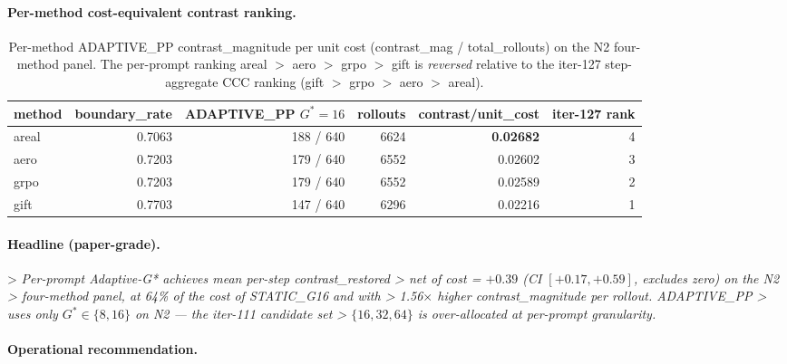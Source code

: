 \paragraph{Per-method cost-equivalent contrast ranking.}

\begin{table}[h]
\centering\small
\caption{Per-method ADAPTIVE\_PP contrast\_magnitude per unit cost
(contrast\_mag / total\_rollouts) on the N2 four-method panel. The per-prompt
ranking areal $>$ aero $>$ grpo $>$ gift is \emph{reversed} relative to the
iter-127 step-aggregate CCC ranking (gift $>$ grpo $>$ aero $>$ areal).}
\label{tab:p7-iter131-method-ranking}
\begin{tabular}{lrrrrr}
\toprule
method & boundary\_rate & ADAPTIVE\_PP $G^*=16$ & rollouts & contrast/unit\_cost & iter-127 rank \\
\midrule
areal  & 0.7063 & 188 / 640 & 6624 & \textbf{0.02682} & 4 \\
aero   & 0.7203 & 179 / 640 & 6552 & 0.02602         & 3 \\
grpo   & 0.7203 & 179 / 640 & 6552 & 0.02589         & 2 \\
gift   & 0.7703 & 147 / 640 & 6296 & 0.02216         & 1 \\
\bottomrule
\end{tabular}
\end{table}

\paragraph{Headline (paper-grade).}

> \emph{Per-prompt Adaptive-G* achieves mean per-step contrast\_restored
> net of cost = $+0.39$ (CI $[+0.17, +0.59]$, excludes zero) on the N2
> four-method panel, at 64\% of the cost of STATIC\_G16 and with
> 1.56$\times$ higher contrast\_magnitude per rollout. ADAPTIVE\_PP
> uses only $G^* \in \{8, 16\}$ on N2 — the iter-111 candidate set
> $\{16, 32, 64\}$ is over-allocated at per-prompt granularity.}

\paragraph{Operational recommendation.}

